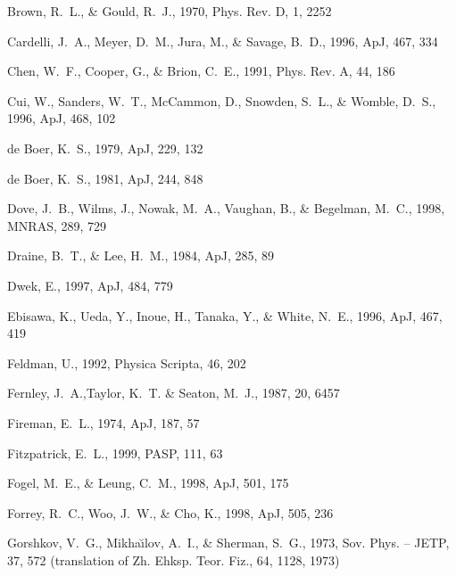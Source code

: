 \documentclass{aastex}
\begin{document}
\begin{thebibliography}{}
Brown, R.~L., \& Gould, R.~J.,  1970, Phys. Rev. D, 1, 2252

Cardelli, J.~A., Meyer, D.~M., Jura, M., \& Savage, B.~D.,  1996, ApJ, 467, 334

Chen, W.~F., Cooper, G., \& Brion, C.~E.,  1991, Phys. Rev. A, 44, 186

Cui, W., Sanders, W.~T., {McCammon}, D., Snowden, S.~L., \& Womble, D.~S.,
  1996, ApJ, 468, 102

{de Boer}, K.~S.,  1979, ApJ, 229, 132

{de Boer}, K.~S.,  1981, ApJ, 244, 848

Dove, J.~B., Wilms, J., Nowak, M.~A., Vaughan, B., \& Begelman, M.~C.,  1998,
  MNRAS, 289, 729

Draine, B.~T., \& Lee, H.~M.,  1984, ApJ, 285, 89

Dwek, E.,  1997, ApJ, 484, 779

Ebisawa, K., Ueda, Y., Inoue, H., Tanaka, Y., \& White, N.~E.,  1996, ApJ, 467,
  419

Feldman, U.,  1992, Physica Scripta, 46, 202

Fernley, J.~A.,Taylor, K.~T. \& Seaton, M.~J., 1987, 20, 6457

Fireman, E.~L.,  1974, ApJ, 187, 57

Fitzpatrick, E.~L.,  1999, PASP, 111, 63

Fogel, M.~E., \& Leung, C.~M.,  1998, ApJ, 501, 175

Forrey, R.~C., Woo, J.~W., \& Cho, K.,  1998, ApJ, 505, 236

Gorshkov, V.~G., {Mikha\u{\i}lov}, A.~I., \& Sherman, S.~G.,  1973, Sov. Phys.
  -- JETP, 37, 572 (translation of  Zh. Ehksp. Teor. Fiz., 64, 1128, 1973)


\end{thebibliography}
\end{document}
